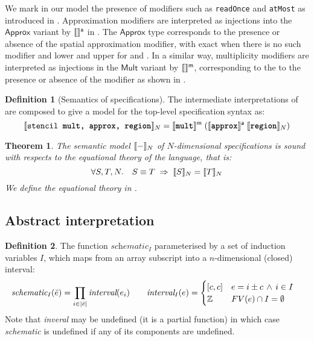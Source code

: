 \documentclass[acmlarge,review,anonymous]{acmart}\settopmatter{printfolios=true}
\theoremstyle{definition}
\newtheorem{defn}{Definition}
\theoremstyle{plain}
\newtheorem{thm}{Theorem}
\theoremstyle{remark}
\begin{document}
We mark in our model the presence of modifiers such as
\texttt{readOnce} and \texttt{atMost} as introduced in \Cref{}.
Approximation modifiers are interpreted as injections into the
$\mathsf{Approx}$ variant by $\llbracket{} {} \rrbracket{}^{\textsf{a}}$ in
.  The $\textsf{Approx}$ type corresponds
to the presence or absence of the spatial approximation modifier, with
\textsf{exact} when there is no such modifier and \textsf{lower} and
\textsf{upper} for  and . In a similar way,
multiplicity modifiers are interpreted as injections in the
$\mathsf{Mult}$ variant by $\llbracket{} {} \rrbracket{}^{\textsf{m}}$, corresponding to the to
the presence or absence of the  modifier as shown in
.

\begin{defn}[Semantics of specifications]
The intermediate interpretations of 
are composed to give a model for the top-level specification
syntax as:
%
\begin{equation*}
  \llbracket{} {\texttt{stencil \texttt{\textbf{mult}}, \texttt{\textbf{approx}}, \texttt{\textbf{region}}}} \rrbracket{}_N =
    \llbracket{} {\texttt{\textbf{mult}}} \rrbracket{}^{\textsf{m}} \;
           {(\llbracket{} {\texttt{\textbf{approx}}} \rrbracket{}^{\textsf{a}} \;
                    {\llbracket{} {\texttt{\textbf{region}}} \rrbracket{}_N)}}
\end{equation*}
\end{defn}
%
\begin{thm}
The semantic model $\llbracket{} {-} \rrbracket{}_N$ of $N$-dimensional specifications
is sound with respects to the equational theory of the language,
that is:
%
\begin{equation*}
\forall S, T, N . \quad
S \equiv T \; \Rightarrow \;
\llbracket{} {S} \rrbracket{}_N = \llbracket{} {T} \rrbracket{}_N
\end{equation*}
%
We define the equational theory in .
\end{thm}

\subsection{Abstract interpretation}
\label{sec:fromcode}

\begin{defn}
The function $\textit{schematic}_I$ parameterised by
a set of induction variables $I$, which maps
from an array subscript into a $n$-dimensional (closed) interval:
%
\begin{align*}
\textit{schematic}_I(\bar{e}) & =
\prod_{i \in |\bar{e}|} \textit{interval}(e_i)
\qquad
\textit{interval}_I(e) = \begin{cases}
[c, c] & e = i \pm c \, \wedge \, i \in I \\
\textnormal{$\mathbb{Z}$} & FV(e) \cap I = \emptyset
\end{cases}
\end{align*}
Note that \textit{inveral} may be undefined (it is a partial function)
in which case \textit{schematic} is undefined if any of its
components are undefined.
\end{defn}
\end{document}
